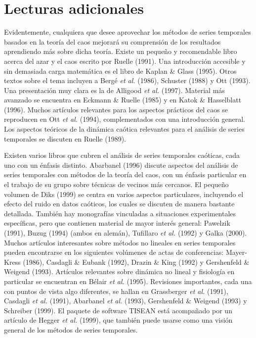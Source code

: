 \documentclass[10pt,a4paper]{book}
\begin{document}
\section{Lecturas adicionales}

Evidentemente, cualquiera que desee aprovechar los métodos de series temporales basados en la teoría del caos mejorará su comprensión de los resultados aprendiendo más sobre dicha teoría. Existe un pequeño y recomendable libro acerca del azar y el caos escrito por Ruelle (1991). Una introducción accesible y sin demasiada carga matemática es el libro de Kaplan \& Glass (1995). Otros textos sobre el tema incluyen a Bergé \emph{et al.} (1986), Schuster (1988) y Ott (1993). Una presentación muy clara es la de Alligood \emph{et al.} (1997). Material más avanzado se encuentra en Eckmann \& Ruelle (1985) y en Katok \& Hasselblatt (1996). Muchos artículos relevantes para los aspectos prácticos del caos se reproducen en Ott \emph{et al.} (1994), complementados con una introducción general. Los aspectos teóricos de la dinámica caótica relevantes para el análisis de series temporales se discuten en Ruelle (1989).

Existen varios libros que cubren el análisis de series temporales caóticas, cada uno con un énfasis distinto. Abarbanel (1996) discute aspectos del análisis de series temporales con métodos de la teoría del caos, con un énfasis particular en el trabajo de su grupo sobre técnicas de vecinos más cercanos. El pequeño volumen de Diks (1999) se centra en varios aspectos particulares, incluyendo el efecto del ruido en datos caóticos, los cuales se discuten de manera bastante detallada. También hay monografías vinculadas a situaciones experimentales específicas, pero que contienen material de mayor interés general: Pawelzik (1991), Buzug (1994) (ambos en alemán), Tufillaro \emph{et al.} (1992) y Galka (2000). Muchos artículos interesantes sobre métodos no lineales en series temporales pueden encontrarse en los siguientes volúmenes de actas de conferencias: Mayer-Kress (1986), Casdagli \& Eubank (1992), Drazin \& King (1992) y Gershenfeld \& Weigend (1993). Artículos relevantes sobre dinámica no lineal y fisiología en particular se encuentran en Bélair \emph{et al.} (1995). Revisiones importantes, cada una con puntos de vista algo diferentes, se hallan en Grassberger \emph{et al.} (1991), Casdagli \emph{et al.} (1991), Abarbanel \emph{et al.} (1993), Gershenfeld \& Weigend (1993) y Schreiber (1999). El paquete de software TISEAN está acompañado por un artículo de Hegger \emph{et al.} (1999), que también puede usarse como una visión general de los métodos de series temporales.
\end{document}

